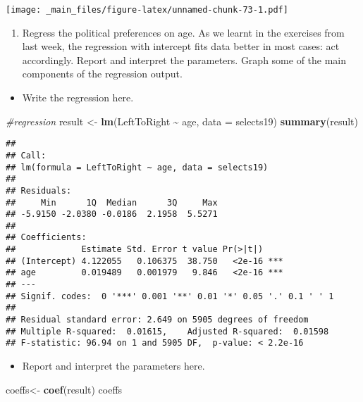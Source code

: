 \documentclass[
]{book}
\newenvironment{Shaded}{\begin{snugshade}}{\end{snugshade}}
\newcommand{\AttributeTok}[1]{\textcolor[rgb]{0.13,0.29,0.53}{#1}}
\newcommand{\CommentTok}[1]{\textcolor[rgb]{0.56,0.35,0.01}{\textit{#1}}}
\newcommand{\FunctionTok}[1]{\textcolor[rgb]{0.13,0.29,0.53}{\textbf{#1}}}
\newcommand{\NormalTok}[1]{#1}
\newcommand{\OtherTok}[1]{\textcolor[rgb]{0.56,0.35,0.01}{#1}}
\newcommand{\SpecialCharTok}[1]{\textcolor[rgb]{0.81,0.36,0.00}{\textbf{#1}}}
\providecommand{\tightlist}{%
  \setlength{\itemsep}{0pt}\setlength{\parskip}{0pt}}
\begin{document}
\texttt{[image: \_main\_files/figure-latex/unnamed-chunk-73-1.pdf]}

\begin{enumerate}
\def\labelenumi{\arabic{enumi}.}
\setcounter{enumi}{2}
\tightlist
\item
  Regress the political preferences on age. As we learnt in the exercises from last week, the regression with intercept fits data better in most cases: act accordingly. Report and interpret the parameters. Graph some of the main components of the regression output.
\end{enumerate}

\begin{itemize}
\tightlist
\item
  Write the regression here.
\end{itemize}

\begin{Shaded}
\begin{Highlighting}[]
\CommentTok{\#regression}
\NormalTok{result }\OtherTok{\textless{}{-}} \FunctionTok{lm}\NormalTok{(LeftToRight }\SpecialCharTok{\textasciitilde{}}\NormalTok{ age, }\AttributeTok{data =}\NormalTok{ selects19)}
\FunctionTok{summary}\NormalTok{(result)}
\end{Highlighting}
\end{Shaded}

\begin{verbatim}
## 
## Call:
## lm(formula = LeftToRight ~ age, data = selects19)
## 
## Residuals:
##     Min      1Q  Median      3Q     Max 
## -5.9150 -2.0380 -0.0186  2.1958  5.5271 
## 
## Coefficients:
##             Estimate Std. Error t value Pr(>|t|)    
## (Intercept) 4.122055   0.106375  38.750   <2e-16 ***
## age         0.019489   0.001979   9.846   <2e-16 ***
## ---
## Signif. codes:  0 '***' 0.001 '**' 0.01 '*' 0.05 '.' 0.1 ' ' 1
## 
## Residual standard error: 2.649 on 5905 degrees of freedom
## Multiple R-squared:  0.01615,    Adjusted R-squared:  0.01598 
## F-statistic: 96.94 on 1 and 5905 DF,  p-value: < 2.2e-16
\end{verbatim}

\begin{itemize}
\tightlist
\item
  Report and interpret the parameters here.
\end{itemize}

\begin{Shaded}
\begin{Highlighting}[]
\NormalTok{coeffs}\OtherTok{\textless{}{-}} \FunctionTok{coef}\NormalTok{(result)}
\NormalTok{coeffs}
\end{Highlighting}
\end{Shaded}
\end{document}
